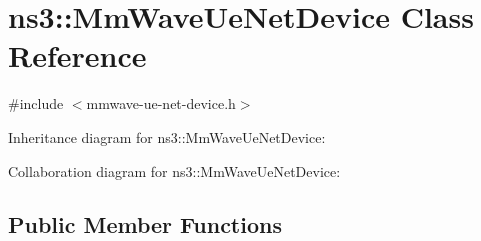 \hypertarget{classns3_1_1MmWaveUeNetDevice}{}\section{ns3\+:\+:Mm\+Wave\+Ue\+Net\+Device Class Reference}
\label{classns3_1_1MmWaveUeNetDevice}


{\ttfamily \#include $<$mmwave-\/ue-\/net-\/device.\+h$>$}



Inheritance diagram for ns3\+:\+:Mm\+Wave\+Ue\+Net\+Device\+:


Collaboration diagram for ns3\+:\+:Mm\+Wave\+Ue\+Net\+Device\+:
\subsection*{Public Member Functions}
